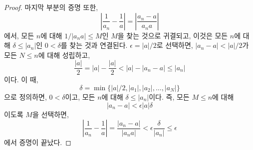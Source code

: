 \begin{proof}
    마지막 부분의 증명 또한,
    \begin{equation*}
        |\frac{1}{a_n} - \frac{1}{a}| = |\frac{a_n - a}{a_n a}|
    \end{equation*}
    에서, 모든 $n$에 대해 $1/|a_n a| \leq M$인 $M$을 찾는 것으로 귀결되고, 이것은 모든 $n$에 대해 $\delta \leq |a_n|$인 $0 < \delta$를 찾는 것과 연결된다.
    $\epsilon = |a|/2$로 선택하면, $|a_n - a| < |a|/2$가 모든 $N \leq n$에 대해 성립하고, 
    \begin{equation*}
        \frac{|a|}{2} = |a| - \frac{|a|}{2}< |a| - |a_n - a| \leq |a_n|
    \end{equation*}
    이다.
    이 때,
    \begin{equation*}
        \delta = \min \{|a|/2, |a_1|, |a_2|, \dots, |a_N|\}
    \end{equation*}
    으로 정의하면, $0 < \delta$이고, 모든 $n$에 대해 $\delta \leq |a_n|$이다.
    즉, 모든 $M \leq n$에 대해
    \begin{equation*}
        |a_n - a| < \epsilon |a| \delta
    \end{equation*}
    이도록 $M$을 선택하면,
    \begin{equation*}
        |\frac{1}{a_n} - \frac{1}{a}| = \frac{|a_n - a|}{|a_n a|} < \epsilon \frac{\delta}{|a_n|} \leq \epsilon
    \end{equation*}
    에서 증명이 끝났다.
\end{proof}

